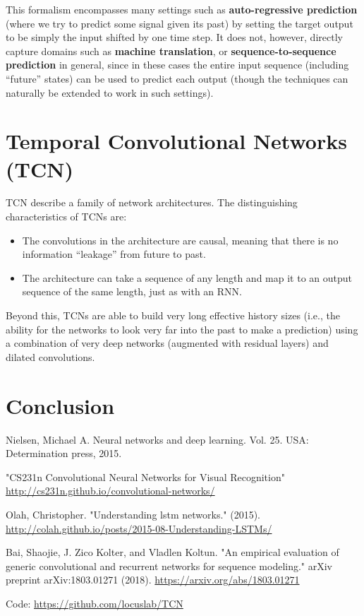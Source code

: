 \documentclass[12pt, titlepage]{article}
\begin{document}
This formalism encompasses many settings such as \textbf{auto-regressive prediction} (where we try to predict some signal given its past) by setting the target output to be simply the input shifted by one time step. It does not, however, directly capture domains such as \textbf{machine translation}, or \textbf{sequence-to-sequence prediction} in general, since in these cases the entire input sequence (including “future” states) can be used to predict each output (though the techniques can naturally be extended to work in such settings).

\section{Temporal Convolutional Networks (TCN)}
TCN describe a family of network architectures.
The distinguishing characteristics of TCNs are: 
\begin{itemize}
\item The convolutions in the architecture are causal, meaning that there is no information “leakage” from future to past.
\item The architecture can take a sequence of any length and map it to an output sequence of the same length, just as with an RNN.
\end{itemize}

Beyond this, TCNs are able to build very long effective history sizes (i.e., the ability for the networks to look very far into the past to make a prediction) using a combination of very deep networks (augmented with residual layers) and dilated convolutions.




\section{Conclusion}





\begin{thebibliography}{0}
   Nielsen, Michael A. Neural networks and deep learning. Vol. 25. USA: Determination press, 2015.
  
   "CS231n Convolutional Neural Networks for Visual Recognition" \url{http://cs231n.github.io/convolutional-networks/}
  
   Olah, Christopher. "Understanding lstm networks." (2015). \url{http://colah.github.io/posts/2015-08-Understanding-LSTMs/}
  
   Bai, Shaojie, J. Zico Kolter, and Vladlen Koltun. "An empirical evaluation of generic convolutional and recurrent networks for sequence modeling." arXiv preprint arXiv:1803.01271 (2018). \url{https://arxiv.org/abs/1803.01271} 
  
  Code: \url{https://github.com/locuslab/TCN}
  
  


  
  
  
  
  \end{thebibliography}


 
\end{document}
